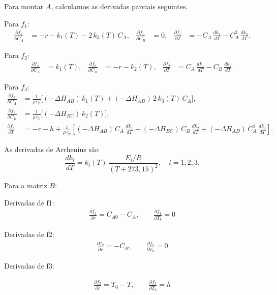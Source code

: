 \documentclass{article}
\begin{document}
Para montar $A$, calculamos as derivadas parciais seguintes.

Para $f_1$:
\begin{align}
\frac{\partial f_1}{\partial C_A} &= -r - k_1(T) - 2\,k_3(T)\,C_A, &
\frac{\partial f_1}{\partial C_B} &= 0, &
\frac{\partial f_1}{\partial T} &= -C_A\,\frac{dk_1}{dT} - C_A^2\,\frac{dk_3}{dT}.
\end{align}

Para $f_2$:
\begin{align}
\frac{\partial f_2}{\partial C_A} &= k_1(T), &
\frac{\partial f_2}{\partial C_B} &= -r - k_2(T), &
\frac{\partial f_2}{\partial T} &= C_A\,\frac{dk_1}{dT} - C_B\,\frac{dk_2}{dT}.
\end{align}

Para $f_3$:
\begin{align}
\frac{\partial f_3}{\partial C_A} &= \frac{1}{\rho\,c_p}\Big[(-\Delta H_{AB})\,k_1(T) + (-\Delta H_{AD})\,2\,k_3(T)\,C_A\Big], \\
\frac{\partial f_3}{\partial C_B} &= \frac{1}{\rho\,c_p}\Big[(-\Delta H_{BC})\,k_2(T)\Big], \\
\frac{\partial f_3}{\partial T} &= -r - h + \frac{1}{\rho\,c_p}\!\left[(-\Delta H_{AB})\,C_A\,\frac{dk_1}{dT} + (-\Delta H_{BC})\,C_B\,\frac{dk_2}{dT} + (-\Delta H_{AD})\,C_A^2\,\frac{dk_3}{dT}\right].
\end{align}

As derivadas de Arrhenius são
\[
\frac{dk_i}{dT} = k_i(T)\,\frac{E_i/R}{(T + 273{,}15)^2}, \quad i=1,2,3.
\]

Para a matriz $B$:

Derivadas de f1: 
\begin{align}
\frac{\partial f_1}{\partial r} = C_{A0} - C_A, \qquad
\frac{\partial f_1}{\partial T_k} = 0
\end{align}

Derivadas de f2:
\begin{align}
\frac{\partial f_2}{\partial r} = -C_B, \qquad
\frac{\partial f_2}{\partial T_k} = 0
\end{align}

Derivadas de f3:

\begin{align}
\frac{\partial f_3}{\partial r} = T_0 - T, \qquad
\frac{\partial f_3}{\partial T_k} = h
\end{align}
\end{document}
